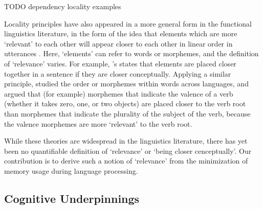 TODO dependency locality examples   


Locality principles have also appeared in a more general form in the functional linguistics literature, in the form of the idea that elements which are more `relevant' to each other will appear closer to each other in linear order in utterances \citep{behaghel1932deutsche,givon1985iconicity,givon1991markedness,bybee-morphology-1985,newmeyer1992iconicity}. Here, `elements' can refer to words or morphemes, and the definition of `relevance' varies. For example, \citet{givon1985iconicity}'s  states that elements are placed closer together in a sentence if they are closer conceptually.
Applying a similar principle, \citet{bybee-morphology-1985} studied the order or morphemes within words across languages, and argued that (for example) morphemes that indicate the valence of a verb (whether it takes zero, one, or two objects) are placed closer to the verb root than morphemes that indicate the plurality of the subject of the verb, because the valence morphemes are more `relevant' to the verb root. %

While these theories are widespread in the linguistics literature, there has yet been no quantifiable definition of `relevance' or `being closer cenceptually'. Our contribution is to derive such a notion of `relevance' from the minimization of memory usage during language processing.


\subsection{Cognitive Underpinnings}

